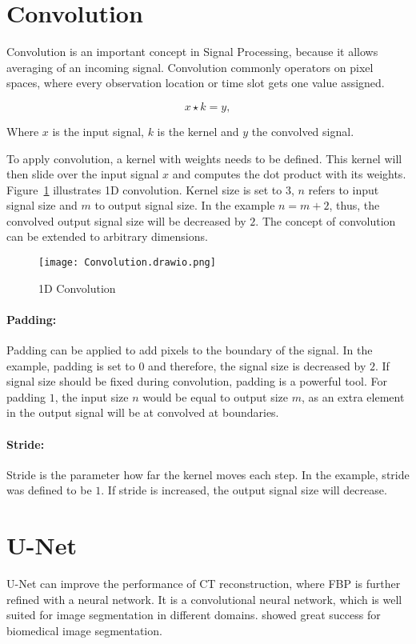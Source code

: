 \section{Convolution}
Convolution is an important concept in Signal Processing, because it allows averaging of an incoming signal.
Convolution commonly operators on pixel spaces, where every observation location or time slot gets one value assigned.

\begin{equation}
  x \star k = y,
\end{equation}

Where $x$ is the input signal, $k$ is the kernel and $y$ the convolved signal.

To apply convolution, a kernel with weights needs to be defined. 
This kernel will then slide over the input signal $x$ and computes the dot product with its weights.
Figure~\ref{fig:1d-convolution} illustrates 1D convolution. Kernel size is set to 3, $n$ refers to input signal size and $m$ to output signal size.
In the example  $ n = m + 2$, thus, the convolved output signal size will be decreased by $2$.
The concept of convolution can be extended to arbitrary dimensions.

\begin{figure}[H]
  \centering
  \texttt{[image: Convolution.drawio.png]}
  \caption{1D Convolution}
  \label{fig:1d-convolution}
\end{figure}

\paragraph{Padding:} 


Padding can be applied to add pixels to the boundary of the signal.
In the example, padding is set to $0$ and therefore, the signal size is decreased by $2$.
If signal size should be fixed during convolution, padding is a powerful tool. For padding $1$,
the input size $n$ would be equal to output size $m$, as an extra element in the output signal
will be at convolved at boundaries.


\paragraph{Stride:}
Stride is the parameter how far the kernel moves each step. In the example, stride was defined to be $1$.
If stride is increased, the output signal size will decrease.

\section{U-Net}
\label{sec:unet}
U-Net can improve the performance of CT reconstruction, where FBP is further refined with a neural network.
It is a convolutional neural network, which is well suited for image segmentation in different domains.
\cite{unet-tomography} showed great success for biomedical image segmentation.

